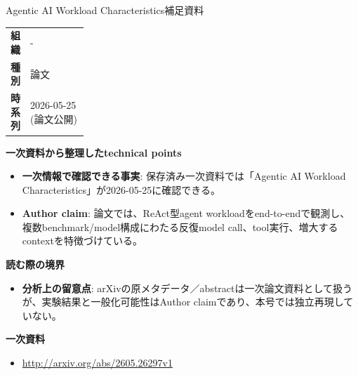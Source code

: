 \begin{technicalnote}{Agentic AI Workload Characteristics}{補足資料}
\begingroup
\begin{tabularx}{\linewidth}{@{}>{\bfseries}p{0.22\linewidth}X@{}}
組織 & - \\
種別 & 論文 \\
時系列 & 2026-05-25 (論文公開) \\
\end{tabularx}
\smallskip
{\bfseries 一次資料から整理したtechnical points}
\begin{itemize}[leftmargin=1.5em,itemsep=0.35em]
\item \textbf{一次情報で確認できる事実}: 保存済み一次資料では「Agentic AI Workload Characteristics」が2026-05-25に確認できる。
\item \textbf{Author claim}: 論文では、ReAct型agent workloadをend-to-endで観測し、複数benchmark/model構成にわたる反復model call、tool実行、増大するcontextを特徴づけている。
\end{itemize}
{\bfseries 読む際の境界}
\begin{itemize}[leftmargin=1.5em,itemsep=0.35em]
\item \textbf{分析上の留意点}: arXivの原メタデータ／abstractは一次論文資料として扱うが、実験結果と一般化可能性はAuthor claimであり、本号では独立再現していない。
\end{itemize}
\begin{samepage}
{\bfseries 一次資料}
\begingroup\sloppy
\begin{itemize}[leftmargin=1.5em,itemsep=0.25em]
\item {\scriptsize\url{http://arxiv.org/abs/2605.26297v1}}
\end{itemize}
\endgroup
\end{samepage}
\endgroup
\end{technicalnote}
\medskip
